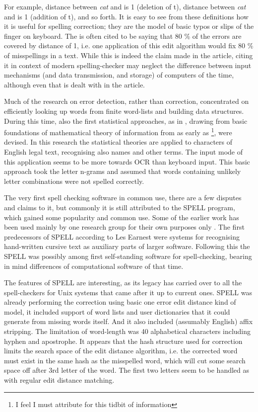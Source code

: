 \documentclass[officiallayout]{unihelcompling}
\newcommand\misspelt{\bgroup\markoverwith
{\textcolor{red}{\lower3.5pt\hbox{\sixly \char58}}}\ULon}
\begin{document}
For example, distance between \emph{cat} and \misspelt{ca} is 1 (deletion of
t), distance between \emph{cat} and \misspelt{catt} is 1 (addition of t), and
so forth.  It is easy to see from these definitions how it is useful for
spelling correction; they are the model of basic typos or slips of the finger
on keyboard. The \citep{damerau1964technique} is often cited to be saying that
80 \% of the errors are covered by distance of 1, i.e. one application of this
edit algorithm would fix 80 \% of misspellings in a text. While this is indeed
the claim made in the article, citing it in context of modern spelling-checker
may neglect the difference between input mechanisms (and data transmission, and
storage) of computers of the time, although even that is dealt with in the
article.

Much of the research on error detection, rather than correction, concentrated
on efficiently looking up words from finite word-lists and building data
structures\citep{}. During this time, also the first statistical approaches, as
in \citep{raviv1967decision}, drawing from basic foundations of mathematical
theory of information from as early as
\citep{shannon1948mathematical}\footnote{I feel I must attribute
\citep{liberman2012noisily} for this tidbit of information}, were devised. In
this research the statistical theories are applied to characters of English
legal text, recognising also names and other terms. The input mode of this
application seems to be more towards OCR than keyboard input. This basic approach took the letter n-grams and assumed that words
containing unlikely letter combinations were not spelled correctly.

The very first spell checking software in common use, there are a few disputes
and claims to it, but commonly it is still attributed to the SPELL
program\citep{gorin1971spell}, which gained some popularity and common use. Some
of the earlier work has been used mainly by one research group for their own
purposes only \citep{earnest2011first,earnest2012first}. The first predecessors
of SPELL according to Les Earnest were systems for recognising hand-written
cursive text as auxiliary parts of larger software. Following this the SPELL
was possibly among first self-standing software for spell-checking, bearing in
mind differences of computational software of that time.

The features of SPELL are interesting, as its legacy has carried over to all
the spell-checkers for Unix systems that came after it up to current ones.
SPELL was already performing the correction using basic one error edit distance
kind of model, it included support of word lists and user dictionaries that it
could generate from missing words itself. And it also included (assumably
English) affix stripping. The limitation of
word-length was 40 alphabetical characters including hyphen and apostrophe. It
appears that the hash structure used for correction limits the search space of
the edit distance algorithm, i.e. the corrected word must exist in the same
hash as the misspelled word, which will cut some search space off after 3rd
letter of the word. The first two letters seem to be handled as with regular
edit distance matching. \citep{gorin1971spell}
\end{document}
